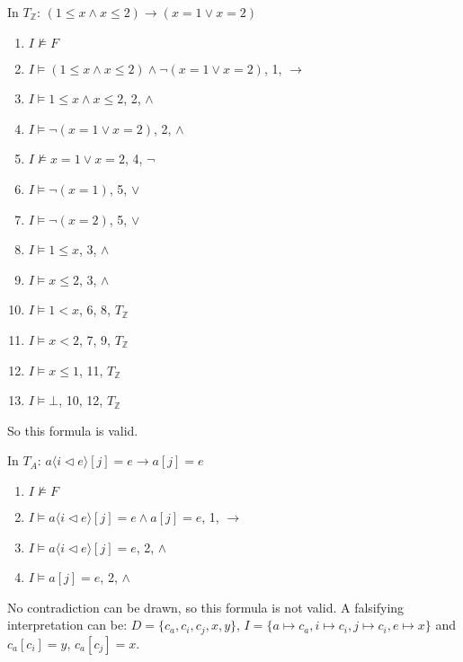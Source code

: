 \documentclass[11pt,a4paper]{article}
\renewcommand{\int}{\mathbb{Z}}
\newcommand{\upd}[2]{\langle #1 \triangleleft #2 \rangle}
\begin{document}
\subproblem In $T_\int$: $(1 \le x \land x \le 2) \to (x = 1 \lor x = 2)$

\begin{solution}
  \begin{enumerate}
    \item $I \not\models F$
    \item $I \models (1 \le x \land x \le 2) \land \lnot (x = 1 \lor x = 2)$, 1, $\to$ 
    \item $I \models 1 \le x \land x \le 2$, 2, $\land$ 
    \item $I \models \lnot (x = 1 \lor x = 2)$, 2, $\land$ 
    \item $I \not\models x = 1 \lor x = 2$, 4, $\lnot$ 
    \item $I \models \lnot(x = 1)$, 5, $\lor$
    \item $I \models \lnot(x = 2)$, 5, $\lor$
    \item $I \models 1 \le x$, 3, $\land$
    \item $I \models x \le 2$, 3, $\land$
    \item $I \models 1 < x$, 6, 8, $T_\int$
    \item $I \models x < 2$, 7, 9, $T_\int$
    \item $I \models x \le 1$, 11, $T_\int$
    \item $I \models \bot$, 10, 12, $T_\int$
  \end{enumerate}

  So this formula is valid.
\end{solution}

\subproblem In $T_A$: $a \upd{i}{e} [j]= e \to a[j] = e$

\begin{solution}
  \begin{enumerate}
    \item $I \not\models F$
    \item $I \models a \upd{i}{e} [j]= e \land a[j] = e$, 1, $\to$
    \item $I \models a \upd{i}{e} [j]= e$, 2, $\land$
    \item $I \models a[j] = e$, 2, $\land$
  \end{enumerate}
  No contradiction can be drawn, so this formula is not valid. A falsifying interpretation can be: $D = \{c_a, c_i, c_j, x, y\}$, $I = \{ a \mapsto c_a, i \mapsto c_i, j \mapsto c_i, e \mapsto x \}$ and $c_a[c_i] = y$, $c_a[c_j] = x$.
\end{solution}

\newpage
{}
\end{document}
